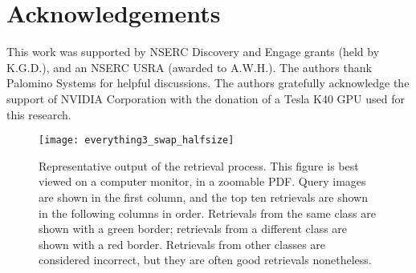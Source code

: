 \documentclass[conference]{IEEEtran_suppress}
\begin{document}
\section*{Acknowledgements}
This work was supported by NSERC Discovery and Engage grants (held by K.G.D.), and an NSERC USRA (awarded to A.W.H.).  The authors thank Palomino Systems for helpful discussions.  The authors gratefully acknowledge the support of NVIDIA Corporation with the donation of a Tesla K40 GPU used for this research.

\begin{figure*}
\begin{center}
\texttt{[image: everything3\_swap\_halfsize]}
\end{center}
   \caption{Representative output of the retrieval process. This figure is best viewed on a computer monitor, in a zoomable PDF. Query images are shown in the first column, and the top ten retrievals are shown in the following columns in order. Retrievals from the same class are shown with a green border; retrievals from a different class are shown with a red border. Retrievals from other classes are considered incorrect, but they are often good retrievals nonetheless.}
\label{fig:ret}
\end{figure*}


{\small


}
\end{document}
